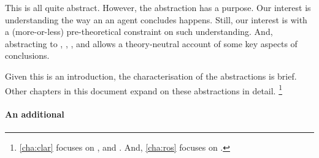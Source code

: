 \begin{note}
  This is all quite abstract.
  However, the abstraction has a purpose.
  Our interest is understanding the way an  an agent concludes happens.
  Still, our interest is with a (more-or-less) pre-theoretical constraint on such understanding.
  And, abstracting to , , , and  allows a theory-neutral account of some key aspects of conclusions.

  Given this is an introduction, the characterisation of the abstractions is brief.
  Other chapters in this document expand on these abstractions in detail.%
  \footnote{
    \autoref{cha:clar} focuses on ,  and .
    And, \autoref{cha:ros} focuses on .
  }
\end{note}



\paragraph*{An additional }


